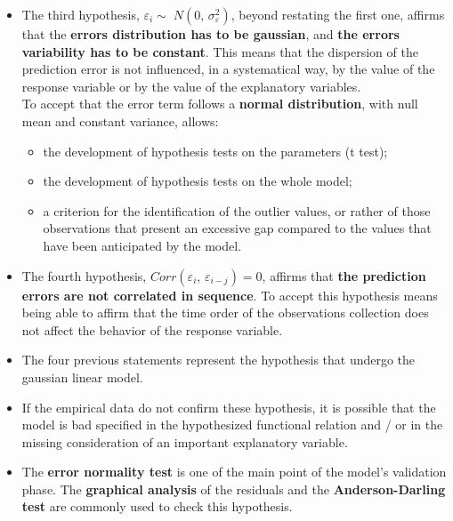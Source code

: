 \begin{frame}
  \vspace*{.5cm}
  \begin{itemize}
  \item The third hypothesis, {\boldmath $ \varepsilon_i \sim\; N(0,\,\sigma^2_\varepsilon) $}, beyond restating the first one, affirms that the \textbf{errors distribution has to be gaussian}, and \textbf{the errors variability has to be constant}. This means that the dispersion of the prediction error is not influenced, in a systematical way, by the value of the response variable or by the value of the explanatory variables. \\ To accept that the error term follows a \textbf{normal distribution}, with null mean and constant variance, allows:
  \begin{itemize}
    \item the development of hypothesis tests on the parameters (t test);
    \item the development of hypothesis tests on the whole model;
    \item a criterion for the identification of the outlier values, or rather of those observations that present an excessive gap compared to the values that have been anticipated by the model.
  \end{itemize}
  \vspace*{.25cm}
  \end{itemize}
\end{frame}

\begin{frame}
  \vspace*{.25cm}
  \begin{itemize}
    \item The fourth hypothesis, {\boldmath $ Corr(\varepsilon_{i},\,\varepsilon_{i-j}) = 0 $}, affirms that \textbf{the prediction errors are not correlated in sequence}. To accept this hypothesis means being able to affirm that the time order of the observations collection does not affect the behavior of the response variable. 
    \item The four previous statements represent the hypothesis that undergo the gaussian linear model. 
    \item If the empirical data do not confirm these hypothesis, it is possible that the model is bad specified in the hypothesized functional relation and / or in the missing consideration of an important explanatory variable.
    \item The \textbf{error normality test} is one of the main point of the model's validation phase. The \textbf{graphical analysis} of the residuals and the \textbf{Anderson-Darling test} are commonly used to check this hypothesis.
  \end{itemize}
\end{frame}

